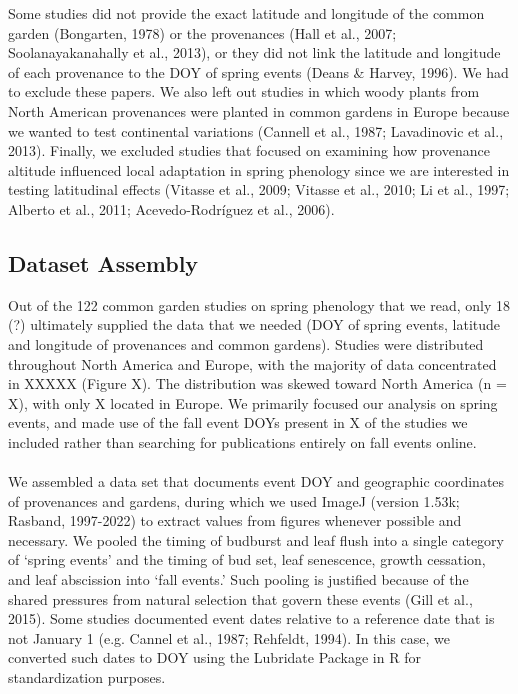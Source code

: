 \documentclass{article}
\begin{document}
Some studies did not provide the exact latitude and longitude of the common garden (Bongarten, 1978) or the provenances (Hall et al., 2007; Soolanayakanahally et al., 2013), or they did not link the latitude and longitude of each provenance to the DOY of spring events (Deans \& Harvey, 1996). We had to exclude these papers. We also left out studies in which woody plants from North American provenances were planted in common gardens in Europe because we wanted to test continental variations (Cannell et al., 1987; Lavadinovic et al., 2013). Finally, we excluded studies that focused on examining how provenance altitude influenced local adaptation in spring phenology since we are interested in testing latitudinal effects (Vitasse et al., 2009; Vitasse et al., 2010; Li et al., 1997; Alberto et al., 2011; Acevedo-Rodríguez et al., 2006). 

\subsection{Dataset Assembly}

Out of the 122 common garden studies on spring phenology that we read, only 18 (?) ultimately supplied the data that we needed (DOY of spring events, latitude and longitude of provenances and common gardens). Studies were distributed throughout North America and Europe, with the majority of data concentrated in XXXXX (Figure X). The distribution was skewed toward North America (n = X), with only X located in Europe. We primarily focused our analysis on spring events, and made use of the fall event DOYs present in X of the studies we included rather than searching for publications entirely on fall events online. 
\\
\\
We assembled a data set that documents event DOY and geographic coordinates of provenances and gardens, during which we used ImageJ (version 1.53k; Rasband, 1997-2022) to extract values from figures whenever possible and necessary. We pooled the timing of budburst and leaf flush into a single category of ‘spring events’ and the timing of bud set, leaf senescence, growth cessation, and leaf abscission into ‘fall events.’ Such pooling is justified because of the shared pressures from natural selection that govern these events (Gill et al., 2015). Some studies documented event dates relative to a reference date that is not January 1 (e.g. Cannel et al., 1987; Rehfeldt, 1994). In this case, we converted such dates to DOY using the Lubridate Package in R for standardization purposes.
\end{document}
